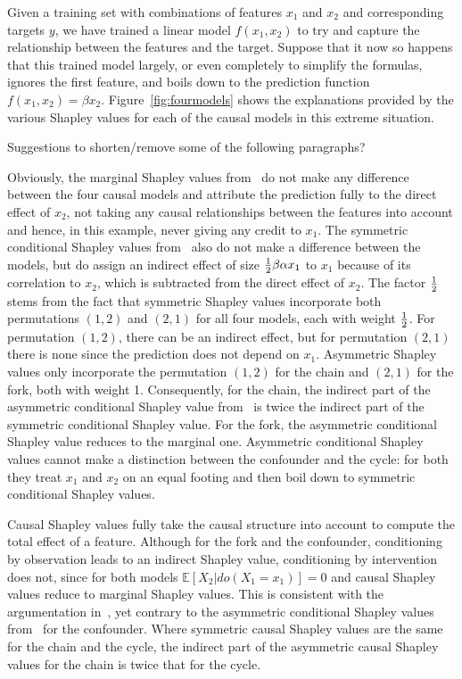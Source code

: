 \documentclass{article}
\newcommand{\expectation}{\mathbb{E}}
\newcommand{\dodo}{\mathit{do}}
\newcommand{\ldo}[1]{\dodo(X_{#1} = x_{#1})}
\newcommand{\comment}[1]{{\color{red} #1}}
\begin{document}
Given a training set with combinations of features $x_1$ and $x_2$ and corresponding targets $y$, we have trained a linear model $f(x_1,x_2)$ to try and capture the relationship between the features and the target. Suppose that it now so happens that this trained model largely, or even completely to simplify the formulas, ignores the first feature, and boils down to the prediction function $f(x_1,x_2) = \beta x_2$. Figure~\ref{fig:fourmodels} shows the explanations provided by the various Shapley values for each of the causal models in this extreme situation.

\comment{Suggestions to shorten/remove some of the following paragraphs?}

Obviously, the marginal Shapley values from~\cite{janzing2019feature,lundberg2020local} do not make any difference between the four causal models and attribute the prediction fully to the direct effect of $x_2$, not taking any causal relationships between the features into account and hence, in this example, never giving any credit to $x_1$.
The symmetric conditional Shapley values from~\cite{aas2019explaining} also do not make a difference between the models, but do assign an indirect effect of size ${1 \over 2} \beta \alpha x_1$ to $x_1$ because of its correlation to $x_2$, which is subtracted from the direct effect of $x_2$. The factor ${1 \over 2}$ stems from the fact that symmetric Shapley values incorporate both permutations $(1,2)$ and $(2,1)$ for all four models, each with weight ${1 \over 2}$. For permutation $(1,2)$, there can be an indirect effect, but for permutation $(2,1)$ there is none since the prediction does not depend on $x_1$.
Asymmetric Shapley values only incorporate the permutation $(1,2)$ for the chain and $(2,1)$ for the fork, both with weight 1. Consequently, for the chain, the indirect part of the asymmetric conditional Shapley value from~\cite{frye2019asymmetric} is twice the indirect part of the symmetric conditional Shapley value. For the fork, the asymmetric conditional Shapley value reduces to the marginal one. Asymmetric conditional Shapley values cannot make a distinction between the confounder and the cycle: for both they treat $x_1$ and $x_2$ on an equal footing and then boil down to symmetric conditional Shapley values.

Causal Shapley values fully take the causal structure into account to compute the total effect of a feature. Although for the fork and the confounder, conditioning by observation leads to an indirect Shapley value, conditioning by intervention does not, since for both models $\expectation[X_2|\ldo{1}] = 0$ and causal Shapley values reduce to marginal Shapley values. This is consistent with the argumentation in~\cite{janzing2019feature}, yet contrary to the asymmetric conditional Shapley values from~\cite{frye2019asymmetric} for the confounder. Where symmetric causal Shapley values are the same for the chain and the cycle, the indirect part of the asymmetric causal Shapley values for the chain is twice that for the cycle.
\end{document}
